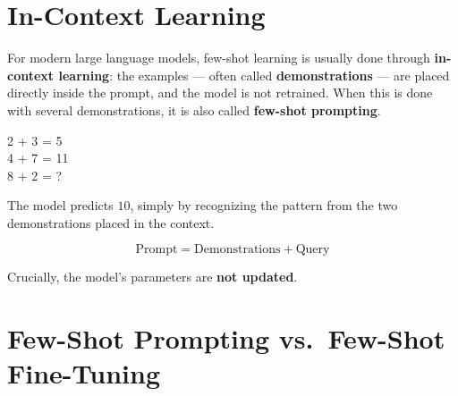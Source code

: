 \documentclass[11pt]{article}
\begin{document}
\begin{center}
\end{center}


\section*{In-Context Learning}
\label{sec:incontext}

For modern large language models, few-shot learning is usually done through \textbf{in-context learning}: the examples — often called \textbf{demonstrations} — are placed directly inside the prompt, and the model is not retrained. When this is done with several demonstrations, it is also called \textbf{few-shot prompting}.

\begin{codebox}
2 + 3 = 5\\
4 + 7 = 11\\
8 + 2 = ?
\end{codebox}

The model predicts $10$, simply by recognizing the pattern from the two demonstrations placed in the context.

\[
\boxed{\text{Prompt} = \text{Demonstrations} + \text{Query}}
\]

Crucially, the model's parameters are \textbf{not updated}.


\section*{Few-Shot Prompting vs.\ Few-Shot Fine-Tuning}
\label{sec:fewshotprompting}
\end{document}
